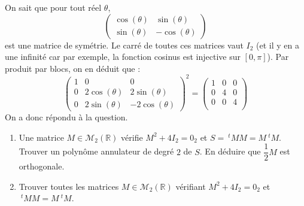 \documentclass[a4paper,10pt]{report}
\begin{document}
\corr On sait que pour tout réel $\theta$,
$$ \begin{pmatrix}
\cos(\theta) & \sin(\theta) \\
\sin(\theta) & -\cos(\theta) 
\end{pmatrix}$$
est une matrice de symétrie. Le carré de toutes ces matrices vaut $I_2$ (et il y en a une infinité car par exemple, la fonction cosinus est injective sur $[0, \pi]$). Par produit par blocs, on en déduit que :
$$ \begin{pmatrix}
1 & 0 & 0 \\
0& 2\cos(\theta) & 2\sin(\theta) \\
0& 2\sin(\theta) & -2\cos(\theta) 
\end{pmatrix}^2= \begin{pmatrix}
1 & 0 & 0 \\
0 & 4 & 0 \\
0 & 0 & 4 \\
\end{pmatrix}$$
On a donc répondu à la question.

\begin{Exa}
\begin{enumerate}
\item Une matrice $M \in \mathcal{M}_2(\mathbb{R})$ vérifie $M^2+4I_2=0_2$ et $S=~^tM M = M ~^tM$. Trouver un polynôme annulateur de degré $2$ de $S$. En déduire que $\dfrac{1}{2}M$ est orthogonale.
\item Trouver toutes les matrices $M \in \mathcal{M}_2(\mathbb{R})$ vérifiant $M^2+4I_2=0_2$ et $~^tM M = M ~^tM$.
\end{enumerate}
\end{Exa}
\end{document}
